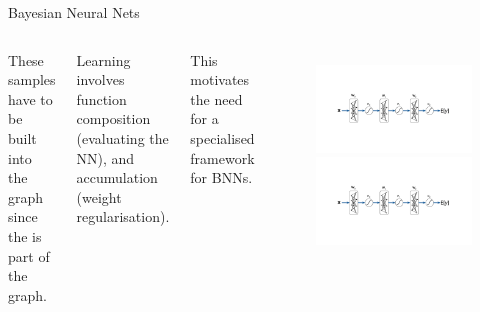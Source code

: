 \documentclass[lualatex, aspectratio=169]{beamer}
\begin{document}
\begin{frame}{Bayesian Neural Nets}

  \begin{columns}
    \column{0.3\pagewidth}
    These samples have to be built into the graph since the  is part of the graph.

    \hspace{1cm}

    Learning involves function composition (evaluating the NN), and accumulation (weight regularisation). 

    \hspace{1cm}

    This motivates the need for a specialised framework for BNNs.

    \column{0.65\pagewidth}
    \begin{figure}
      \includegraphics[page=2, trim={3cm 2.5cm 0cm 4.5cm}, clip, width=0.63\pagewidth]{assets/pictures.pdf}
      \includegraphics[page=4, trim={3cm 2.5cm 0cm 4.5cm}, clip, width=0.63\pagewidth]{assets/pictures.pdf}
    \end{figure}
  \end{columns}

\end{frame}
\end{document}
